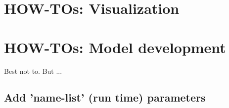 \documentclass[10pt,twoside]{article}
\begin{document}
\newpage
\section{HOW-TOs: Visualization}\label{how-to-7}


\newpage
\section{HOW-TOs: Model development}\label{how-to-8}

Best not to. But ...


\subsection{Add 'name-list' (run time) parameters}
\end{document}
